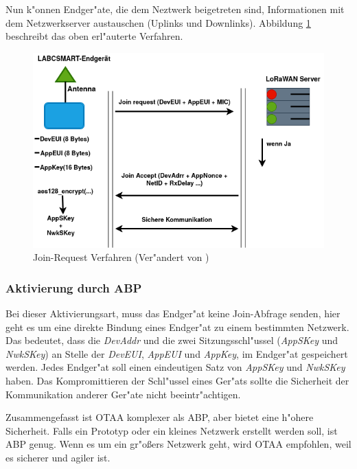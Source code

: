 Nun k"onnen Endger"ate, die dem Neztwerk beigetreten sind, Informationen 
mit dem Netzwerkserver austauschen (Uplinks und Downlinks). Abbildung 
\ref{fig:request} beschreibt das oben erl"auterte Verfahren.


\begin{figure}[h]
	\centering
	\includegraphics[width=14cm]{source/images/Join-Procedure}
	\caption{Join-Request Verfahren (Ver"andert von \cite{Entcription})\label{fig:request}}
\end{figure}


\vspace{10cm}
\subsubsection{Aktivierung durch ABP}

Bei dieser Aktivierungsart, muss das Endger"at keine Join-Abfrage 
senden, hier geht es um eine direkte Bindung eines Endger"at zu einem 
bestimmten Netzwerk. Das bedeutet, dass die \textit{DevAddr} und die 
zwei Sitzungsschl"ussel (\textit{AppSKey} und \textit{NwkSKey}) an 
Stelle der \textit{DevEUI}, \textit{AppEUI} und \textit{AppKey}, im 
Endger"at gespeichert werden. Jedes Endger"at soll einen eindeutigen Satz 
von \textit{AppSKey} und \textit{NwkSKey} haben. Das Kompromittieren der 
Schl"ussel eines Ger"ats sollte die Sicherheit der Kommunikation anderer 
Ger"ate nicht beeintr"achtigen. 


Zusammengefasst ist OTAA komplexer als ABP, aber bietet eine h"ohere 
Sicherheit. Falls ein Prototyp oder ein kleines Netzwerk erstellt werden 
soll, ist ABP genug. Wenn es um ein gr"o\ss{}ers Netzwerk geht, wird OTAA 
empfohlen, weil es sicherer und agiler ist. 

